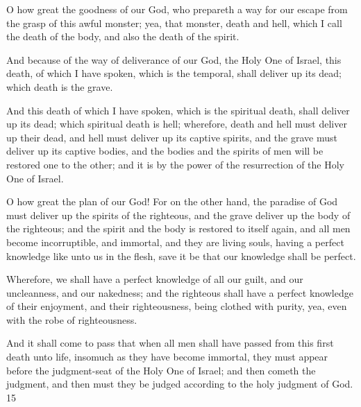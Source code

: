 O how great the goodness of our God, who prepareth a way for our escape from the grasp of
this awful monster; yea, that monster, death and hell, which I call the death of the body, and
also the death of the spirit.

And because of the way of deliverance of our God, the Holy One of Israel, this death, of
which I have spoken, which is the temporal, shall deliver up its dead; which death is the
grave.

And this death of which I have spoken, which is the spiritual death, shall deliver up its dead;
which spiritual death is hell; wherefore, death and hell must deliver up their dead, and hell
must deliver up its captive spirits, and the grave must deliver up its captive bodies, and the
bodies and the spirits of men will be restored one to the other; and it is by the power of the
resurrection of the Holy One of Israel.

O how great the plan of our God! For on the other hand, the paradise of God must deliver up
the spirits of the righteous, and the grave deliver up the body of the righteous; and the spirit
and the body is restored to itself again, and all men become incorruptible, and immortal, and
they are living souls, having a perfect knowledge like unto us in the flesh, save it be that our
knowledge shall be perfect.

Wherefore, we shall have a perfect knowledge of all our guilt, and our uncleanness, and our
nakedness; and the righteous shall have a perfect knowledge of their enjoyment, and their
righteousness, being clothed with purity, yea, even with the robe of righteousness.

And it shall come to pass that when all men shall have passed from this first death unto life,
insomuch as they have become immortal, they must appear before the judgment-seat of the
Holy One of Israel; and then cometh the judgment, and then must they be judged according
to the holy judgment of God. 15

